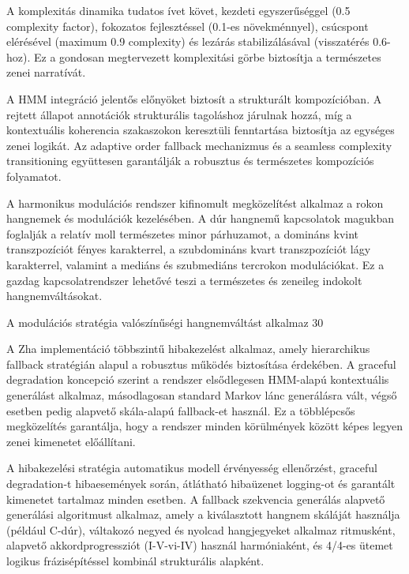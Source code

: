 A komplexitás dinamika tudatos ívet követ, kezdeti egyszerűséggel (0.5 complexity factor), fokozatos fejlesztéssel (0.1-es növekménnyel), csúcspont elérésével (maximum 0.9 complexity) és lezárás stabilizálásával (visszatérés 0.6-hoz). Ez a gondosan megtervezett komplexitási görbe biztosítja a természetes zenei narratívát.

A HMM integráció jelentős előnyöket biztosít a strukturált kompozícióban. A rejtett állapot annotációk strukturális tagoláshoz járulnak hozzá, míg a kontextuális koherencia szakaszokon keresztüli fenntartása biztosítja az egységes zenei logikát. Az adaptive order fallback mechanizmus és a seamless complexity transitioning együttesen garantálják a robusztus és természetes kompozíciós folyamatot.

A harmonikus modulációs rendszer kifinomult megközelítést alkalmaz a rokon hangnemek és modulációk kezelésében. A dúr hangnemű kapcsolatok magukban foglalják a relatív moll természetes minor párhuzamot, a domináns kvint transzpozíciót fényes karakterrel, a szubdomináns kvart transzpozíciót lágy karakterrel, valamint a mediáns és szubmediáns tercrokon modulációkat. Ez a gazdag kapcsolatrendszer lehetővé teszi a természetes és zeneileg indokolt hangnemváltásokat.

A modulációs stratégia valószínűségi hangnemváltást alkalmaz 30%

A Zha implementáció többszintű hibakezelést alkalmaz, amely hierarchikus fallback stratégián alapul a robusztus működés biztosítása érdekében. A graceful degradation koncepció szerint a rendszer elsődlegesen HMM-alapú kontextuális generálást alkalmaz, másodlagosan standard Markov lánc generálásra vált, végső esetben pedig alapvető skála-alapú fallback-et használ. Ez a többlépcsős megközelítés garantálja, hogy a rendszer minden körülmények között képes legyen zenei kimenetet előállítani.

A hibakezelési stratégia automatikus modell érvényesség ellenőrzést, graceful degradation-t hibaesemények során, átlátható hibaüzenet logging-ot és garantált kimenetet tartalmaz minden esetben. A fallback szekvencia generálás alapvető generálási algoritmust alkalmaz, amely a kiválasztott hangnem skáláját használja (például C-dúr), váltakozó negyed és nyolcad hangjegyeket alkalmaz ritmusként, alapvető akkordprogressziót (I-V-vi-IV) használ harmóniaként, és 4/4-es ütemet logikus frázisépítéssel kombinál strukturális alapként.

